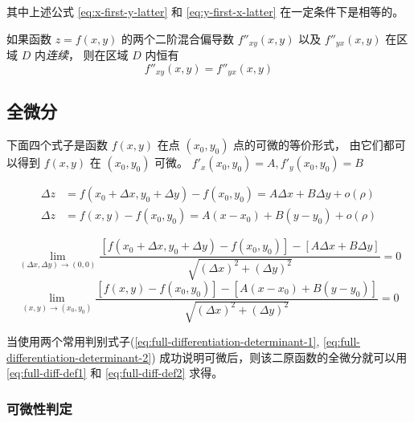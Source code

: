 其中上述公式 \ref{eq:x-first-y-latter} 和 \ref{eq:y-first-x-latter} 在一定条件下是相等的。

\begin{theorem}
    如果函数 $z = f(x, y)$ 的两个二阶混合偏导数 $f''_{xy}(x, y)$ 以及 $f''_{yx}(x, y)$
    在区域 $D$ 内\emph{连续}， 则在区域 $D$ 内恒有
    \[
        f''_{xy}(x, y) = 
        f''_{yx}(x, y)
    \]
\end{theorem}

\subsection{全微分}
下面四个式子是函数 $f(x, y)$ 在点 $(x_0, y_0)$ 点的可微的等价形式，
由它们都可以得到 $f(x, y)$ 在 $(x_0, y_0)$ 可微。
$f'_x(x_0, y_0) = A, f'_y(x_0, y_0) = B$ 

\begin{strip}
    \begin{align}
        \Delta z &= f(x_0 + \Delta x, y_0 + \Delta y) - f(x_0, y_0) = A \Delta x + B \Delta y + o(\rho)\label{eq:full-diff-def1}\\
        \Delta z &= f(x, y) - f(x_0, y_0) = A (x - x_0) + B (y - y_0) + o(\rho)\label{eq:full-diff-def2}
    \end{align}

    \begin{equation}
        \label{eq:full-differentiation-determinant-1}
        \lim_{(\Delta x,\Delta y) \to (0,0) }
        \dfrac{\left[ f(x_0 + \Delta x, y_0 + \Delta y) - f(x_0, y_0) \right]-\left[ A\Delta x + B \Delta y \right]}{\sqrt{\left( \Delta x \right)^2 + \left( \Delta y \right)^2}} = 0
    \end{equation}
    \begin{equation}
        \label{eq:full-differentiation-determinant-2}
        \lim_{(x,y) \to (x_0,y_0) }
        \dfrac{\left[ f(x,y) - f(x_0, y_0) \right]-\left[ A(x - x_0) + B(y - y_0) \right]}{\sqrt{\left( \Delta x \right)^2 + \left( \Delta y \right)^2}} = 0
    \end{equation}
\end{strip}

当使用两个常用判别式子(\ref{eq:full-differentiation-determinant-1}, \ref{eq:full-differentiation-determinant-2})
成功说明可微后，则该二原函数的全微分就可以用 \ref{eq:full-diff-def1} 和 \ref{eq:full-diff-def2} 求得。

\subsubsection{可微性判定}

